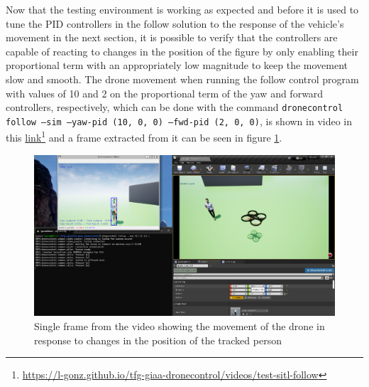 Now that the testing environment is working as expected and before it is used to tune the PID controllers in the follow solution to the response of the vehicle's movement in the next section, it is possible to verify that the controllers are capable of reacting to changes in the position of the figure by only enabling their proportional term with an appropriately low magnitude to keep the movement slow and smooth.
The drone movement when running the follow control program with values of 10 and 2 on the proportional term of the yaw and forward controllers, respectively, which can be done with the command \texttt{dronecontrol follow --sim --yaw-pid (10, 0, 0) --fwd-pid (2, 0, 0)}, is shown in video in this \href{https://l-gonz.github.io/tfg-giaa-dronecontrol/videos/test-sitl-follow}{link}\footnote{\url{https://l-gonz.github.io/tfg-giaa-dronecontrol/videos/test-sitl-follow}} and a frame extracted from it can be seen in figure \ref{fig:airsim-test-follow}.

\begin{figure}
  \centering
  \includegraphics[width=\textwidth, keepaspectratio]{img/video-follow-sitl.png}
  \caption{Single frame from the video showing the movement of the drone in response to changes in the position of the tracked person}
  \label{fig:airsim-test-follow}
\end{figure}